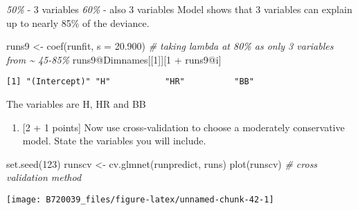\documentclass[
]{article}
\newenvironment{Shaded}{\begin{snugshade}}{\end{snugshade}}
\newcommand{\AttributeTok}[1]{\textcolor[rgb]{0.77,0.63,0.00}{#1}}
\newcommand{\CommentTok}[1]{\textcolor[rgb]{0.56,0.35,0.01}{\textit{#1}}}
\newcommand{\DecValTok}[1]{\textcolor[rgb]{0.00,0.00,0.81}{#1}}
\newcommand{\FloatTok}[1]{\textcolor[rgb]{0.00,0.00,0.81}{#1}}
\newcommand{\FunctionTok}[1]{\textcolor[rgb]{0.00,0.00,0.00}{#1}}
\newcommand{\NormalTok}[1]{#1}
\newcommand{\OtherTok}[1]{\textcolor[rgb]{0.56,0.35,0.01}{#1}}
\newcommand{\SpecialCharTok}[1]{\textcolor[rgb]{0.00,0.00,0.00}{#1}}
\providecommand{\tightlist}{%
  \setlength{\itemsep}{0pt}\setlength{\parskip}{0pt}}
\begin{document}
\emph{50\%} - 3 variables \emph{60\%} - also 3 variables Model shows
that 3 variables can explain up to nearly 85\% of the deviance.

\begin{Shaded}
\begin{Highlighting}[]
\NormalTok{runs9 }\OtherTok{\textless{}{-}} \FunctionTok{coef}\NormalTok{(runfit, }\AttributeTok{s =} \FloatTok{20.900}\NormalTok{) }\CommentTok{\# taking lambda at 80\% as only 3 variables from \textasciitilde{} 45{-}85\%}
\NormalTok{runs9}\SpecialCharTok{@}\NormalTok{Dimnames[[}\DecValTok{1}\NormalTok{]][}\DecValTok{1} \SpecialCharTok{+}\NormalTok{ runs9}\SpecialCharTok{@}\NormalTok{i]}
\end{Highlighting}
\end{Shaded}

\begin{verbatim}
[1] "(Intercept)" "H"           "HR"          "BB"         
\end{verbatim}

The variables are H, HR and BB

\begin{enumerate}
\def\labelenumi{\alph{enumi}.}
\setcounter{enumi}{3}
\tightlist
\item
  {[}2 + 1 points{]} Now use cross-validation to choose a moderately
  conservative model. State the variables you will include.
\end{enumerate}

\begin{Shaded}
\begin{Highlighting}[]
\FunctionTok{set.seed}\NormalTok{(}\DecValTok{123}\NormalTok{)}
\NormalTok{runscv }\OtherTok{\textless{}{-}} \FunctionTok{cv.glmnet}\NormalTok{(runpredict, runs)}
\FunctionTok{plot}\NormalTok{(runscv) }\CommentTok{\# cross validation method}
\end{Highlighting}
\end{Shaded}

\begin{center}\texttt{[image: B720039\_files/figure-latex/unnamed-chunk-42-1]} \end{center}

\begin{Shaded}
\end{Shaded}
\end{document}
